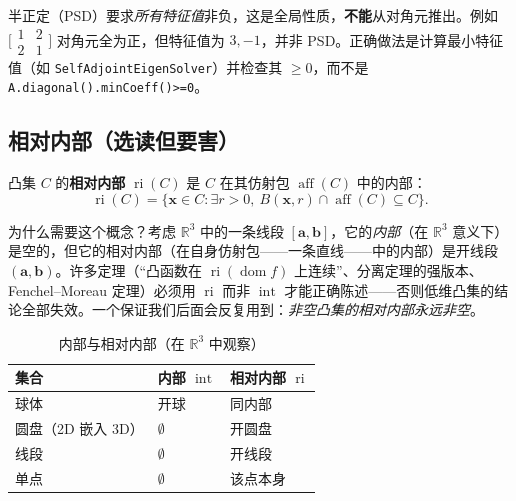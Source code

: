 \begin{pitfall}
半正定（PSD）要求\emph{所有特征值}非负，这是全局性质，\textbf{不能}从对角元推出。例如 $\big[\begin{smallmatrix}1&2\\2&1\end{smallmatrix}\big]$ 对角元全为正，但特征值为 $3,-1$，并非 PSD。正确做法是计算最小特征值（如 \texttt{SelfAdjointEigenSolver}）并检查其 $\ge0$，而不是 \texttt{A.\allowbreak diagonal().\allowbreak minCoeff()>=0}。
\end{pitfall}

\subsection{相对内部（选读但要害）}
\label{subsec:cvx-relint}

\begin{definition}[相对内部]\label{def:relint}
凸集 $C$ 的\textbf{相对内部} $\operatorname{ri}(C)$ 是 $C$ 在其仿射包 $\operatorname{aff}(C)$ 中的内部：
\begin{equation}
  \operatorname{ri}(C)=\{\mathbf x\in C:\exists r>0,\ B(\mathbf x,r)\cap\operatorname{aff}(C)\subseteq C\}.
  \label{eq:relint-def}
\end{equation}
\end{definition}

为什么需要这个概念？考虑 $\mathbb{R}^3$ 中的一条线段 $[\mathbf a,\mathbf b]$，它的\emph{内部}（在 $\mathbb{R}^3$ 意义下）是空的，但它的相对内部（在自身仿射包——一条直线——中的内部）是开线段 $(\mathbf a,\mathbf b)$。许多定理（“凸函数在 $\operatorname{ri}(\operatorname{dom}f)$ 上连续”、分离定理的强版本、Fenchel--Moreau 定理）必须用 $\operatorname{ri}$ 而非 $\operatorname{int}$ 才能正确陈述——否则低维凸集的结论全部失效。一个保证我们后面会反复用到：\emph{非空凸集的相对内部永远非空}。

\begin{table}[H]\centering\small
\caption{内部与相对内部（在 $\mathbb{R}^3$ 中观察）}
\label{tab:relint}
\begin{tabular}{lll}
\toprule
集合 & 内部 $\operatorname{int}$ & 相对内部 $\operatorname{ri}$ \\
\midrule
球体 & 开球 & 同内部 \\
圆盘（2D 嵌入 3D） & $\emptyset$ & 开圆盘 \\
线段 & $\emptyset$ & 开线段 \\
单点 & $\emptyset$ & 该点本身 \\
\bottomrule
\end{tabular}
\end{table}

